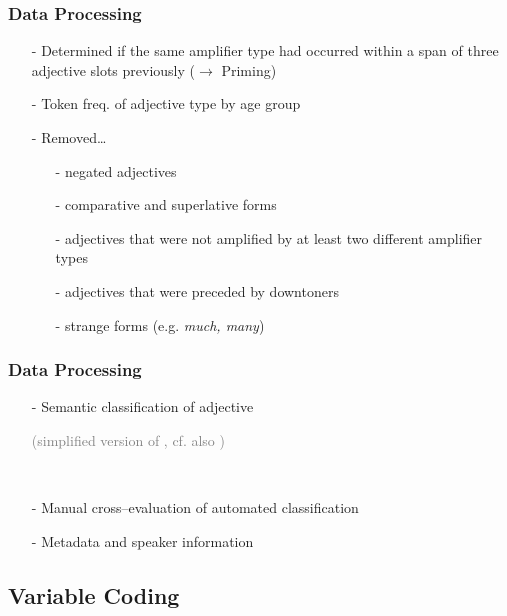 \documentclass[12pt, table]{beamer}
\begin{document}
\begin{frame}
\frametitle{Data Processing}
\begin{itemize}
\item[-] Determined if the same amplifier type had occurred within a span of three adjective slots previously ($\rightarrow$ Priming)
\item[-] Token freq. of adjective type by age group \textcolor{gray}{\begin{scriptsize}\citep{tagliamonte2005weird}\end{scriptsize}} 
\item[-] Removed\dots
\begin{itemize}
\item[-] negated adjectives
\item[-] comparative and superlative forms
\item[-] adjectives that were not amplified by at least two different amplifier types
\item[-] adjectives that were preceded by downtoners
\item[-] strange forms (e.g. \textit{much, many})
\end{itemize}
\end{itemize} 
\end{frame}

\begin{frame}
\frametitle{Data Processing}
\begin{itemize}
\item[-] Semantic classification of adjective \textcolor{gray}{\begin{scriptsize}(simplified version of \citet{dixon1977adjectives}, cf. also \citet{darcy2015stability, tagliamonte2005weird, tagliamonte2006so, tagliamonte2008intensifiers})\end{scriptsize}}\\[.15cm] 
\item[-] Manual cross--evaluation of automated classification\\[.15cm]
\item[-] Metadata and speaker information
\end{itemize} 
\end{frame}

\subsection{Variable Coding}
\end{document}
